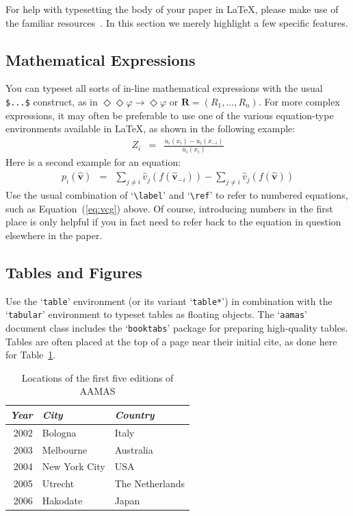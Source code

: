 \documentclass[sigconf,anonymous]{aamas}
\begin{document}
For help with typesetting the body of your paper in \LaTeX\@, please 
make use of the familiar resources~\cite{Lam94}. In this section we 
merely highlight a few specific features. 

\subsection{Mathematical Expressions}

You can typeset all sorts of in-line mathematical expressions 
with the usual \verb|$...$| construct, as in 
$\Diamond\Diamond\varphi \rightarrow \Diamond\varphi$ or 
$\boldsymbol{R} = (R_1,\ldots,R_n)$.
For more complex expressions, it may often be preferable to use one of
the various equation-type environments available in \LaTeX\@, as shown 
in the following example:
%
\begin{eqnarray}
Z_i & = & \frac{u_i(x_i) - u_i(x_{-i})}{u_i(x_i)}
\end{eqnarray}
%
Here is a second example for an equation: 
%
\begin{eqnarray}\label{eq:vcg}
p_i(\boldsymbol{\hat{v}}) & = &
\sum_{j \neq i} \hat{v}_j(f(\boldsymbol{\hat{v}}_{-i})) - 
\sum_{j \neq i} \hat{v}_j(f(\boldsymbol{\hat{v}})) 
\end{eqnarray}
%
Use the usual combination of `\verb|\label|' and `\verb|\ref|' to refer
to numbered equations, such as Equation~(\ref{eq:vcg}) above. Of course,
introducing numbers in the first place is only helpful if you in fact 
need to refer back to the equation in question elsewhere in the paper.


\subsection{Tables and Figures}

Use the `\texttt{table}' environment (or its variant `\texttt{table*}')
in combination with the `\texttt{tabular}' environment to typeset tables
as floating objects. The `\texttt{aamas}' document class includes the 
`\texttt{booktabs}' package for preparing high-quality tables. Tables 
are often placed at the top of a page near their initial cite, as done 
here for Table~\ref{tab:locations}.

\begin{table}[t]
	\caption{Locations of the first five editions of AAMAS}
	\label{tab:locations}
	\begin{tabular}{rll}\toprule
		\textit{Year} & \textit{City} & \textit{Country} \\ \midrule
		2002 & Bologna & Italy \\
		2003 & Melbourne & Australia \\
		2004 & New York City & USA \\
		2005 & Utrecht & The Netherlands \\
		2006 & Hakodate & Japan \\ \bottomrule
	\end{tabular}
\end{table}
\end{document}
